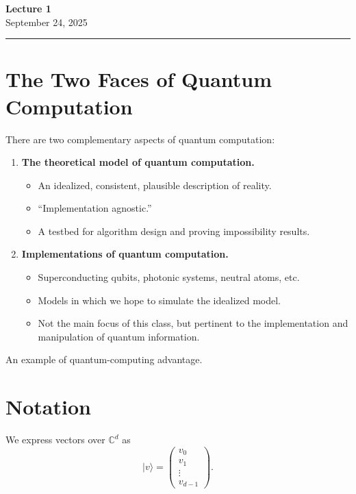 \documentclass[11pt]{article}
\newcommand{\ket}[1]{\lvert #1\rangle}
\newcommand{\C}{\mathbb{C}}
\begin{document}
\begin{center}
  {\LARGE\bfseries Lecture 1}\\[0.35em]
  {\large September 24, 2025}
\end{center}

\hrule
\vspace{0.8em}

\section{The Two Faces of Quantum Computation}

There are two complementary aspects of quantum computation:

\begin{enumerate}
  \item \textbf{The theoretical model of quantum computation.}
  \begin{itemize}
    \item An idealized, consistent, plausible description of reality.
    \item ``Implementation agnostic.''
    \item A testbed for algorithm design and proving impossibility results.
  \end{itemize}

  \item \textbf{Implementations of quantum computation.}
  \begin{itemize}
    \item Superconducting qubits, photonic systems, neutral atoms, etc.
    \item Models in which we hope to simulate the idealized model.
    \item Not the main focus of this class, but pertinent to the implementation
          and manipulation of quantum information.
  \end{itemize}
\end{enumerate}

An example of quantum-computing advantage.

\section{Notation}

We express vectors over $\C^d$ as
\[
  \ket{v}
  =
  \begin{pmatrix}
    v_0\\
    v_1\\
    \vdots\\
    v_{d-1}
  \end{pmatrix}.
\]
\end{document}
